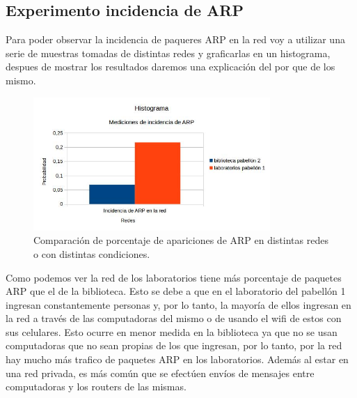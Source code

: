 
\subsection{Experimento incidencia de ARP}

Para poder observar la incidencia de paqueres ARP en la red voy a utilizar una serie de muestras tomadas de distintas redes y graficarlas en un histograma, despues de mostrar
los resultados daremos una explicación del por que de los mismo.

\begin{figure}[ht!]
\centering
\includegraphics[width=90mm]{imagenes/IncidenciaARP.jpg}
\caption{Comparación de porcentaje de apariciones de ARP en distintas redes o con distintas condiciones.\label{overflow}}
\end{figure}

Como podemos ver la red de los laboratorios tiene más porcentaje de paquetes ARP que el de la biblioteca. Esto se debe a que en el laboratorio del pabellón 1 ingresan 
constantemente personas y, por lo tanto, la mayoría de ellos ingresan en la red a través de las computadoras del mismo o de usando el wifi de estos con sus celulares. Esto 
ocurre en menor medida en la biblioteca ya que no se usan computadoras que no sean propias de los que ingresan, por lo tanto, por la red hay mucho más trafico de paquetes 
ARP en los laboratorios. Además al estar en una red privada, es más común que se efectúen envíos de mensajes entre computadoras y los routers de las mismas.

